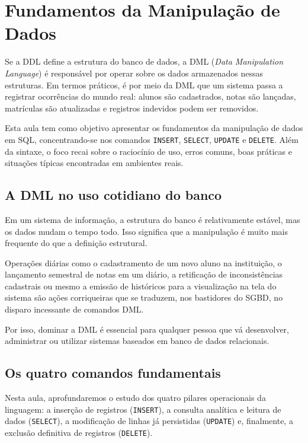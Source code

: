 \chapter{Fundamentos da Manipulação de Dados}
\label{cap:fundamentos_manipulacao_dados}

Se a DDL define a estrutura do banco de dados, a DML (\textit{Data Manipulation Language}) é responsável por operar sobre os dados armazenados nessas estruturas. Em termos práticos, é por meio da DML que um sistema passa a registrar ocorrências do mundo real: alunos são cadastrados, notas são lançadas, matrículas são atualizadas e registros indevidos podem ser removidos.

Esta aula tem como objetivo apresentar os fundamentos da manipulação de dados em SQL, concentrando-se nos comandos \texttt{INSERT}, \texttt{SELECT}, \texttt{UPDATE} e \texttt{DELETE}. Além da sintaxe, o foco recai sobre o raciocínio de uso, erros comuns, boas práticas e situações típicas encontradas em ambientes reais.

\section{A DML no uso cotidiano do banco}

Em um sistema de informação, a estrutura do banco é relativamente estável, mas os dados mudam o tempo todo. Isso significa que a manipulação é muito mais frequente do que a definição estrutural.

Operações diárias como o cadastramento de um novo aluno na instituição, o lançamento semestral de notas em um diário, a retificação de inconsistências cadastrais ou mesmo a emissão de históricos para a visualização na tela do sistema são ações corriqueiras que se traduzem, nos bastidores do SGBD, no disparo incessante de comandos DML.

Por isso, dominar a DML é essencial para qualquer pessoa que vá desenvolver, administrar ou utilizar sistemas baseados em banco de dados relacionais.

\section{Os quatro comandos fundamentais}

Nesta aula, aprofundaremos o estudo dos quatro pilares operacionais da linguagem: a inserção de registros (\texttt{INSERT}), a consulta analítica e leitura de dados (\texttt{SELECT}), a modificação de linhas já persistidas (\texttt{UPDATE}) e, finalmente, a exclusão definitiva de registros (\texttt{DELETE}).

